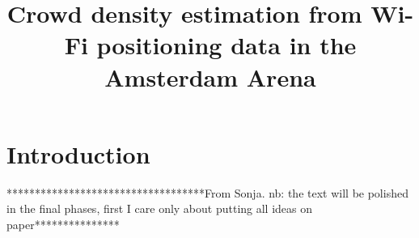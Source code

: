 \documentclass[10pt,a4paper]{article}
\begin{document}
\title{Crowd density estimation from Wi-Fi positioning data in the Amsterdam Arena}
\maketitle

\begin{abstract}

\end{abstract}

\section{Introduction}


***********************************From Sonja. nb: the text will be polished in the final phases, first I care only about putting all ideas on paper***************
\end{document}
